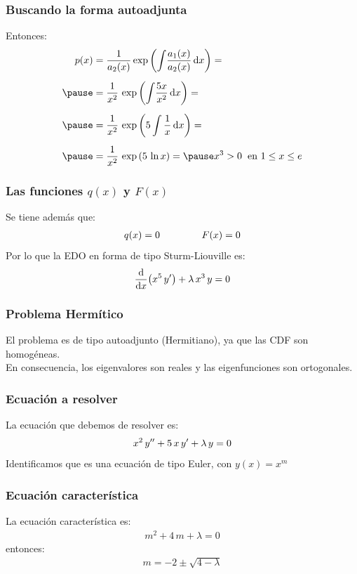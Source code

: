 \documentclass[12pt]{beamer}
\begin{document}
\begin{frame}
\frametitle{Buscando la forma autoadjunta}
Entonces:
\pause
\begin{eqnarray*}
\begin{aligned}
p(x) &= \dfrac{1}{a_{2}(x)} \exp \left( \scaleint{5ex} \dfrac{a_{1}(x)}{a_{2}(x)} \dd{x} \right) = \\[0.5em] \pause
&= \dfrac{1}{x^{2}} \, \exp \left( \scaleint{5ex} \dfrac{5 x}{x^{2}} \dd{x} \right) = \\[0.5em] \pause
&= \dfrac{1}{x^{2}} \,  \exp \left( 5 \, \scaleint{5ex} \, \dfrac{1}{x} \dd{x} \right) = \\[0.5em] \pause
&= \dfrac{1}{x^{2}} \,  \exp \left( 5 \, \ln x \right) = \pause x^{3} > 0 \hspace{0.2cm} \mbox{en } 1 \leq x \leq e
\end{aligned}
\end{eqnarray*}
\end{frame}
\begin{frame}
\frametitle{Las funciones $q(x)$ y $F(x)$}
Se tiene además que:
\pause
\begin{align*}
q(x) = 0 \hspace{1.5cm} F(x) = 0
\end{align*}
\pause
Por lo que la EDO en forma de tipo Sturm-Liouville es:
\pause
\begin{align*}
\dv{x} \big( x^{5} \, {y}^{\prime} \big) + \lambda \, x^{3} \, y = 0
\end{align*}
\end{frame}
\begin{frame}
\frametitle{Problema Hermítico}
El problema es de tipo autoadjunto (Hermitiano), ya que las CDF son homogéneas.
\\
\bigskip
\pause
En consecuencia, los eigenvalores son reales y las eigenfunciones son ortogonales.
\end{frame}
\begin{frame}
\frametitle{Ecuación a resolver}
La ecuación que debemos de resolver es:
\begin{align*}
x^{2} \, {y}^{\prime \prime} + 5 \, x \, {y}^{\prime} + \lambda \, y = 0
\end{align*}
\pause
Identificamos que es una ecuación de tipo Euler, con $y(x) = x^{m}$
\end{frame}
\begin{frame}
\frametitle{Ecuación característica}
La ecuación característica es:
\pause
\begin{align*}
m^{2} + 4 \, m + \lambda = 0
\end{align*}
\pause
entonces:
\begin{align*}
m = - 2 \pm \sqrt{4 - \lambda}
\end{align*}
\end{frame}
\end{document}
